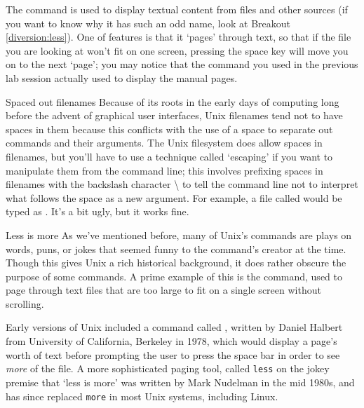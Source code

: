 
The  command is used to display textual content from files and other sources (if you want to know why it has such an odd name, look at Breakout \ref{diversion:less}). One of  features is that it `pages' through text, so that if the file you are looking at won't fit on one screen, pressing the space key will move you on to the next `page'; you may notice that the  command you used in the previous lab session actually used  to display the manual pages.

\begin{linux}{Spaced out filenames}
Because of its roots in the early days of computing long before the advent of graphical user interfaces, Unix filenames tend not to have spaces in them because this conflicts with the use of a space to separate out commands and their arguments. The Unix filesystem does allow spaces in filenames, but you'll have to use a technique called `escaping' if you want to manipulate them from the command line; this involves prefixing spaces in filenames with the backslash character \textbackslash{} to tell the command line not to interpret what follows the space as a new argument. For example, a file called  would be typed as . It's a bit ugly, but it works fine. 
\end{linux} 

\begin{diversion}{Less is more}
\label{diversion:less}
As we've mentioned before, many of Unix's commands are plays on words, puns, or jokes that seemed funny to the command's creator at the time. Though this gives Unix a rich historical background, it does rather obscure the purpose of some commands. A prime example of this is the  command, used to page through text files that are too large to fit on a single screen without scrolling. 

Early versions of Unix included a command called , written by Daniel Halbert from University of California, Berkeley in 1978, which would display a page's worth of text before prompting the user to press the space bar in order to see \textit{more} of the file. A more sophisticated paging tool, called \texttt{less} on the jokey premise that `less is more' was written by Mark Nudelman in the mid 1980s, and has since replaced \texttt{more} in most Unix systems, including Linux. 
\end{diversion}

